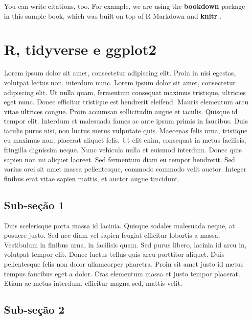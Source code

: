 \documentclass[]{book}
\begin{document}
You can write citations, too. For example, we are using the \textbf{bookdown} package \citep{R-bookdown} in this sample book, which was built on top of R Markdown and \textbf{knitr} \citep{xie2015}.

\hypertarget{r-tidyverse-e-ggplot2}{%
\chapter{R, tidyverse e ggplot2}\label{r-tidyverse-e-ggplot2}}

Lorem ipsum dolor sit amet, consectetur adipiscing elit. Proin in nisi egestas, volutpat lectus non, interdum nunc. Lorem ipsum dolor sit amet, consectetur adipiscing elit. Ut nulla quam, fermentum consequat maximus tristique, ultricies eget nunc. Donec efficitur tristique est hendrerit eleifend. Mauris elementum arcu vitae ultrices congue. Proin accumsan sollicitudin augue et iaculis. Quisque id tempor elit. Interdum et malesuada fames ac ante ipsum primis in faucibus. Duis iaculis purus nisi, non luctus metus vulputate quis. Maecenas felis urna, tristique eu maximus non, placerat aliquet felis. Ut elit enim, consequat in metus facilisis, fringilla dignissim neque. Nunc vehicula nulla et euismod interdum. Donec quis sapien non mi aliquet laoreet. Sed fermentum diam eu tempor hendrerit. Sed varius orci sit amet massa pellentesque, commodo commodo velit auctor. Integer finibus erat vitae sapien mattis, et auctor augue tincidunt.

\hypertarget{sub-seuxe7uxe3o-1}{%
\section{Sub-seção 1}\label{sub-seuxe7uxe3o-1}}

Duis scelerisque porta massa id lacinia. Quisque sodales malesuada neque, at posuere justo. Sed nec diam vel sapien feugiat efficitur lobortis a massa. Vestibulum in finibus urna, in facilisis quam. Sed purus libero, lacinia id arcu in, volutpat tempor elit. Donec luctus tellus quis arcu porttitor aliquet. Duis pellentesque felis non dolor ullamcorper pharetra. Proin sit amet justo id metus tempus faucibus eget a dolor. Cras elementum massa et justo tempor placerat. Etiam ac metus interdum, efficitur magna sed, mattis velit.

\hypertarget{sub-seuxe7uxe3o-2}{%
\section{Sub-seção 2}\label{sub-seuxe7uxe3o-2}}
\end{document}
